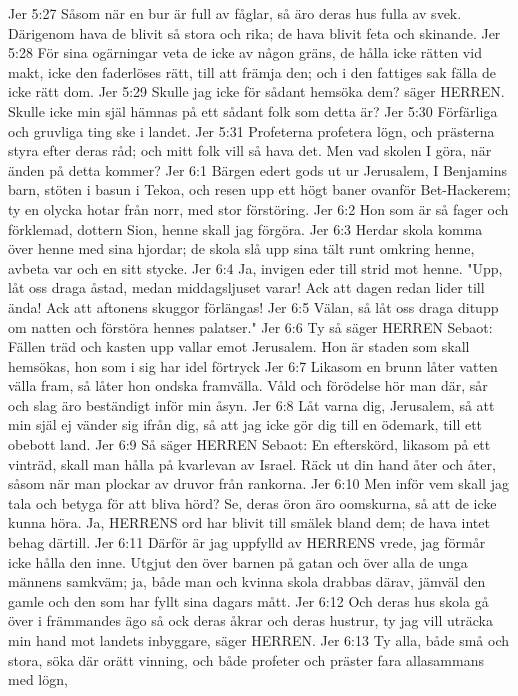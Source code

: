 Jer 5:27  Såsom när en bur är full av fåglar, så äro deras hus fulla av svek. Därigenom hava de blivit så stora och rika; de hava blivit feta och skinande.
Jer 5:28  För sina ogärningar veta de icke av någon gräns, de hålla icke rätten vid makt, icke den faderlöses rätt, till att främja den; och i den fattiges sak fälla de icke rätt dom.
Jer 5:29  Skulle jag icke för sådant hemsöka dem? säger HERREN. Skulle icke min själ hämnas på ett sådant folk som detta är?
Jer 5:30  Förfärliga och gruvliga ting ske i landet.
Jer 5:31  Profeterna profetera lögn, och prästerna styra efter deras råd; och mitt folk vill så hava det. Men vad skolen I göra, när änden på detta kommer?
Jer 6:1  Bärgen edert gods ut ur Jerusalem, I Benjamins barn, stöten i basun i Tekoa, och resen upp ett högt baner ovanför Bet-Hackerem; ty en olycka hotar från norr, med stor förstöring.
Jer 6:2  Hon som är så fager och förklemad, dottern Sion, henne skall jag förgöra.
Jer 6:3  Herdar skola komma över henne med sina hjordar; de skola slå upp sina tält runt omkring henne, avbeta var och en sitt stycke.
Jer 6:4  Ja, invigen eder till strid mot henne. "Upp, låt oss draga åstad, medan middagsljuset varar! Ack att dagen redan lider till ända! Ack att aftonens skuggor förlängas!
Jer 6:5  Välan, så låt oss draga ditupp om natten och förstöra hennes palatser."
Jer 6:6  Ty så säger HERREN Sebaot: Fällen träd och kasten upp vallar emot Jerusalem. Hon är staden som skall hemsökas, hon som i sig har idel förtryck
Jer 6:7  Likasom en brunn låter vatten välla fram, så låter hon ondska framvälla. Våld och förödelse hör man där, sår och slag äro beständigt inför min åsyn.
Jer 6:8  Låt varna dig, Jerusalem, så att min själ ej vänder sig ifrån dig, så att jag icke gör dig till en ödemark, till ett obebott land.
Jer 6:9  Så säger HERREN Sebaot: En efterskörd, likasom på ett vinträd, skall man hålla på kvarlevan av Israel. Räck ut din hand åter och åter, såsom när man plockar av druvor från rankorna.
Jer 6:10  Men inför vem skall jag tala och betyga för att bliva hörd? Se, deras öron äro oomskurna, så att de icke kunna höra. Ja, HERRENS ord har blivit till smälek bland dem; de hava intet behag därtill.
Jer 6:11  Därför är jag uppfylld av HERRENS vrede, jag förmår icke hålla den inne. Utgjut den över barnen på gatan och över alla de unga männens samkväm; ja, både man och kvinna skola drabbas därav, jämväl den gamle och den som har fyllt sina dagars mått.
Jer 6:12  Och deras hus skola gå över i främmandes ägo så ock deras åkrar och deras hustrur, ty jag vill uträcka min hand mot landets inbyggare, säger HERREN.
Jer 6:13  Ty alla, både små och stora, söka där orätt vinning, och både profeter och präster fara allasammans med lögn,
